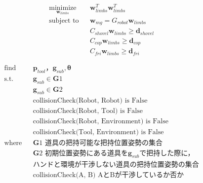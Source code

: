\begin{align}
  & \underset{\bm{w}_{limbs}} {\text{minimize}} && \bm{w}_{limbs}^T \bm{w}_{limbs}^T\\
  & \text{subject to} && \bm{w}_{mg} = G_{robot} \bm{w}_{limbs} \\
  & && C_{shovel} \bm{w}_{limbs} \geq \bm{d}_{shovel} \\
  & && C_{cop} \bm{w}_{limbs} \geq \bm{d}_{cop} \\
  & && C_{fri} \bm{w}_{limbs} \geq \bm{d}_{fri}
\end{align}

\begin{align*}
  & \text{find} && {\bm p_{tool}}，{\bm g_{sub}}, {\bm \theta}\\
  & \text{s.t.} && {\bm g_{sub}} \in {\bm G1}\\
  &  && {\bm g_{sub}} \in {\bm G2}\\
  & && \text{collisionCheck(Robot, Robot)} \text{ is False}\\  
  & && \text{collisionCheck(Robot, Tool)} \text{ is False}\\
  & && \text{collisionCheck(Robot, Environment)} \text{ is False}\\
  & && \text{collisionCheck(Tool, Environment)} \text{ is False}\\  
  & \text{where} && {\bm G1} \text{ 道具の把持可能な把持位置姿勢の集合}\\
  & && {\bm G2} \text{ 初期位置姿勢にある道具を} {\bm g_{sub}} \text{で把持した際に，}\\
  & && \text{ハンドと環境が干渉しない道具の把持位置姿勢の集合}\\    
  & && \text{collisionCheck(A, B)} \text{ AとBが干渉しているか否か}\\
\end{align*}
